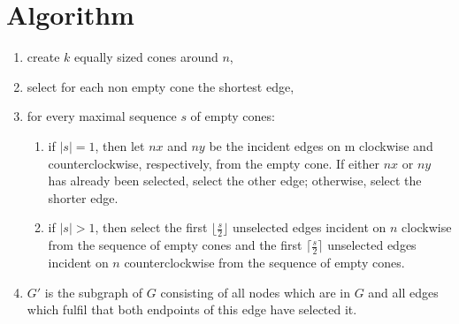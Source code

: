 \section{Algorithm}


\begin{enumerate}
\item create $k $ equally sized cones around $n $,
\item select for each non empty cone the shortest edge,
\item for every maximal sequence $s $ of empty cones:
\begin{enumerate}
	\item if $|s|=1 $, then let $nx $ and $ny $ be the incident edges on m clockwise and counterclockwise, respectively, from the empty cone.
	If either $nx $ or $ny $ has already been selected, select the other edge;
	otherwise, select the shorter edge.
\item if $|s| > 1 $, then select the first $\lfloor \frac{s}{2} \rfloor $ unselected edges incident on $n $ clockwise from the sequence of empty cones and the first $\lceil \frac{s}{2} \rceil $ unselected edges incident on $n $ counterclockwise from the sequence of empty cones.
\end{enumerate}
\item $ G' $ is the subgraph of $G $ consisting of all nodes which are in $G $ and all edges which fulfil that both endpoints of this edge have selected it.  
\end{enumerate}


